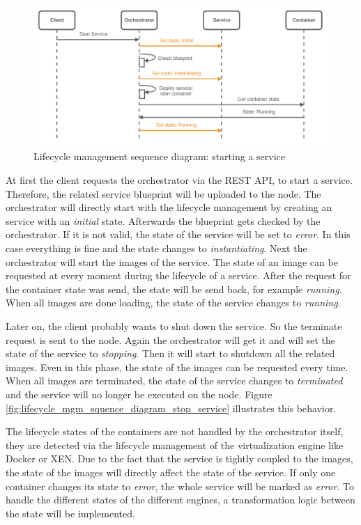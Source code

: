 \begin{figure}[H]
    \centering
    \includegraphics[width=\textwidth]{resources/images/lifecycle_sequence_diagram_start_service.png}
    \caption[Lifecycle management sequence diagram: starting a service]{Lifecycle management sequence diagram: starting a service}
    \label{fig:lifecycle_mgm_squence_diagram_start_service}
\end{figure}

At first the client requests the orchestrator via the \ac{REST} \ac{API}, to start a service.
Therefore, the related service blueprint will be uploaded to the node.
The orchestrator will directly start with the lifecycle management by creating an service with an \textit{initial} state.
Afterwards the blueprint gets checked by the orchestrator.
If it is not valid, the state of the service will be set to \textit{error}.
In this case everything is fine and the state changes to \textit{instantiating}.
Next the orchestrator will start the images of the service.
The state of an image can be requested at every moment during the lifecycle of a service.
After the request for the container state was send, the state will be send back, for example \textit{running}.
When all images are done loading, the state of the service changes to \textit{running}.

Later on, the client probably wants to shut down the service.
So the terminate request is sent to the node.
Again the orchestrator will get it and will set the state of the service to \textit{stopping}.
Then it will start to shutdown all the related images.
Even in this phase, the state of the images can be requested every time.
When all images are terminated, the state of the service changes to \textit{terminated} and the service will no longer be executed on the node.
Figure \ref{fig:lifecycle_mgm_squence_diagram_stop_service} illustrates this behavior.

The lifecycle states of the containers are not handled by the orchestrator itself, they are detected via the lifecycle management of the virtualization engine like Docker or XEN.
Due to the fact that the service is tightly coupled to the images, the state of the images will directly affect the state of the service.
If only one container changes its state to \textit{error}, the whole service will be marked as \textit{error}.
To handle the different states of the different engines, a transformation logic between the state will be implemented.

